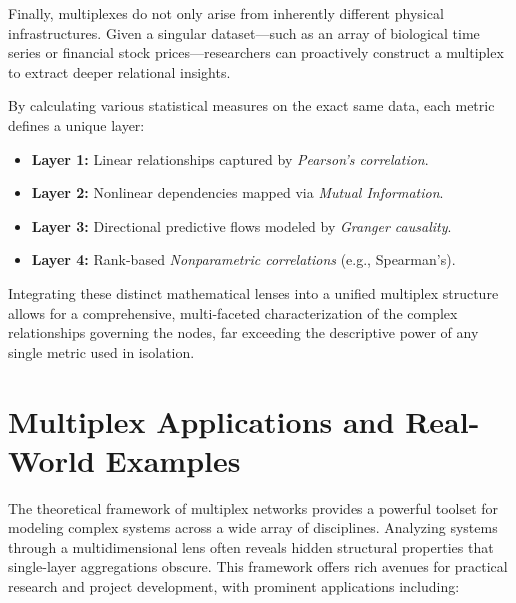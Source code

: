 Finally, multiplexes do not only arise from inherently different physical infrastructures. Given a singular dataset—such as an array of biological time series or financial stock prices—researchers can proactively construct a multiplex to extract deeper relational insights.

By calculating various statistical measures on the exact same data, each metric defines a unique layer:
\begin{itemize}
    \item \textbf{Layer 1:} Linear relationships captured by \textit{Pearson's correlation}.
    \item \textbf{Layer 2:} Nonlinear dependencies mapped via \textit{Mutual Information}.
    \item \textbf{Layer 3:} Directional predictive flows modeled by \textit{Granger causality}.
    \item \textbf{Layer 4:} Rank-based \textit{Nonparametric correlations} (e.g., Spearman's).
\end{itemize}
Integrating these distinct mathematical lenses into a unified multiplex structure allows for a comprehensive, multi-faceted characterization of the complex relationships governing the nodes, far exceeding the descriptive power of any single metric used in isolation.

\section{Multiplex Applications and Real-World Examples}
\label{sec:multiplex_applications}

The theoretical framework of multiplex networks provides a powerful toolset for modeling complex systems across a wide array of disciplines. Analyzing systems through a multidimensional lens often reveals hidden structural properties that single-layer aggregations obscure. This framework offers rich avenues for practical research and project development, with prominent applications including:

